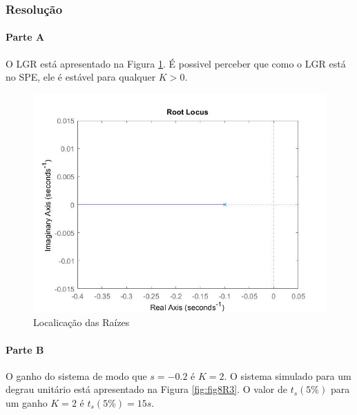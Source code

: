 \documentclass[
]{book}
\theoremstyle{definition}
\theoremstyle{definition}
\theoremstyle{definition}
\theoremstyle{remark}
\begin{document}
\hypertarget{resoluuxe7uxe3o-22}{%
\subsubsection*{Resolução}\label{resoluuxe7uxe3o-22}}

\hypertarget{parte-a-9}{%
\paragraph{Parte A}\label{parte-a-9}}

O LGR está apresentado na Figura \ref{fig:fig8R1}. É possivel perceber que como o LGR está no SPE, ele é estável para qualquer \(K > 0\).

\begin{figure}

{\centering \includegraphics{Imagens/Lab8/Resolução/fig1} 

}

\caption{Localicação das Raízes}\label{fig:fig8R1}
\end{figure}

\hypertarget{parte-b-9}{%
\paragraph{Parte B}\label{parte-b-9}}

O ganho do sistema de modo que \(s = -0.2\) é \(K = 2\). O sistema simulado para um degrau unitário está apresentado na Figura \ref{fig:fig8R3}. O valor de \(t_s(5\%)\) para um ganho \(K = 2\) é \(t_s(5\%) = 15s\).
\end{document}
